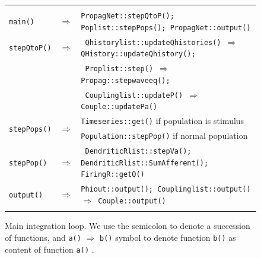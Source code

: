 \documentclass[12pt,a4paper]{article}
\newcommand{\type}[1]{ {\small\small\tt #1} }
\begin{document}
\begin{figure}[h!]\begin{center}
\begin{tabular}{ | l l p{12cm} | }
\hline \\

\type{main()}& $\Rightarrow$ &\type{PropagNet::stepQtoP(); Poplist::stepPops(); PropagNet::output() }\\[6pt]

\type{stepQtoP()}& $\Rightarrow$ &
\type{ Qhistorylist::updateQhistories() $\Rightarrow$ QHistory::updateQhistory(); }\\
&&\type{ Proplist::step() $\Rightarrow$ Propag::stepwaveeq(); } \\
&&\type{ Couplinglist::updateP() $\Rightarrow$ Couple::updatePa() }\\[6pt]

\multirow{2}{*}{\type{stepPops()}}&\multirow{2}{*}{$\Rightarrow$}&
\type{Timeseries::get()} if population is stimulus \\
&& \type{Population::stepPop()} if normal population \\[6pt]

\type{stepPop()} & $\Rightarrow$ & \type{ DendriticRlist::stepVa(); DendriticRlist::SumAfferent(); FiringR::getQ() } \\[6pt]

\type{output()}&$\Rightarrow$& \type{Phiout::output(); Couplinglist::output() $\Rightarrow$ Couple::output() }\\

\\\hline
\end{tabular}
\caption{Main integration loop. We use the semicolon to denote a succession of functions, and \type{a()} $\Rightarrow$ \type{b()} symbol to denote function \type{b()} as content of function \type{a()}.}\label{fig:main-loop}
\end{center}\end{figure}
\end{document}

